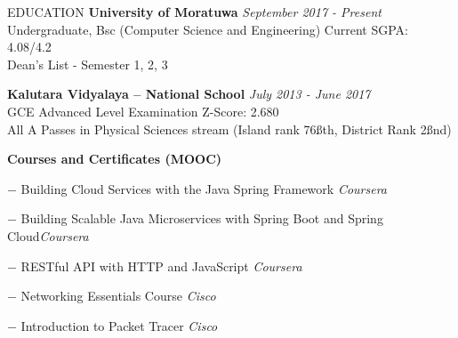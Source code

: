 \documentclass{cv}
\begin{document}
\begin{rSection}{EDUCATION}
    {\bf University of Moratuwa}                                \hfill {\em September 2017 - Present}
    \\ Undergraduate, Bsc (Computer Science and Engineering)    \hfill { Current SGPA: 4.08/4.2 }
    \\ Dean's List - Semester 1, 2, 3 \par

    {\bf Kalutara Vidyalaya – National School}                  \hfill {\em July 2013 - June 2017}
    \\ GCE Advanced Level Examination                           \hfill { Z-Score: 2.680 }
    \\ All A Passes in Physical Sciences stream (Island rank 76\ss{th}, District Rank 2\ss{nd}) \par

    {\bf Courses and Certificates (MOOC)}
    \vspace{-4pt}
    \begin{compactitem}
        \item[$-$]  { Building Cloud Services with the Java Spring Framework}                \hfill {\em Coursera}
        \item[$-$]  { Building Scalable Java Microservices with Spring Boot and Spring Cloud}\hfill {\em Coursera}
        \item[$-$]  { RESTful API with HTTP and JavaScript}                                  \hfill {\em Coursera}
        \item[$-$]  { Networking Essentials Course}                                                 \hfill {\em Cisco}
        \item[$-$]  { Introduction to Packet Tracer}                                         \hfill {\em Cisco}
    \end{compactitem}
\end{rSection}


\end{document}
